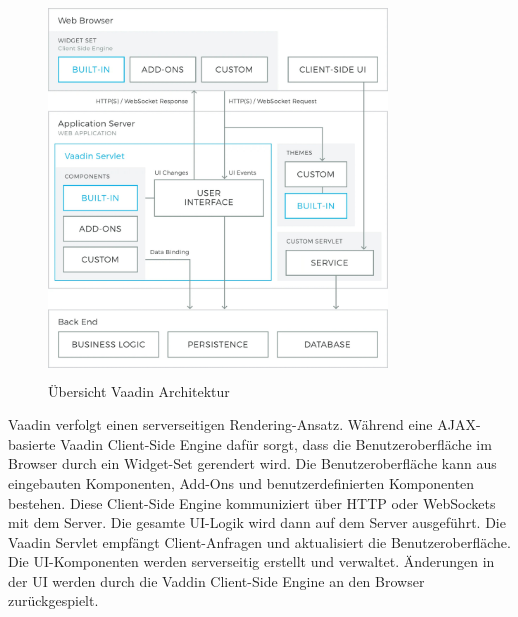 \documentclass[a4paper,12pt]{scrreprt}
\begin{document}
	\begin{figure}[h!]
		\centering
		\includegraphics[width=9cm, height=10cm]{vaadin_architekture.jpg}
		\caption{\label{vaadin:architektur}Übersicht Vaadin Architektur \cite{architecture21}}
	\end{figure}
	Vaadin verfolgt einen serverseitigen Rendering-Ansatz. Während eine AJAX-basierte Vaadin Client-Side Engine dafür sorgt, dass die Benutzeroberfläche im Browser durch ein Widget-Set gerendert wird. Die Benutzeroberfläche kann aus eingebauten Komponenten, Add-Ons und benutzerdefinierten Komponenten bestehen. Diese Client-Side Engine kommuniziert über HTTP oder WebSockets mit dem Server. Die gesamte UI-Logik wird dann auf dem Server ausgeführt. Die Vaadin Servlet empfängt Client-Anfragen und aktualisiert die Benutzeroberfläche. Die UI-Komponenten werden serverseitig erstellt und verwaltet. Änderungen in der UI werden durch die Vaddin Client-Side Engine an den Browser zurückgespielt.  
	
\end{document}
